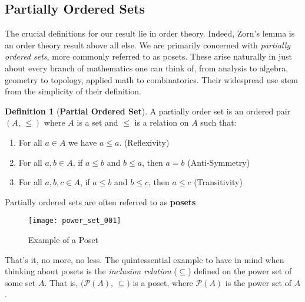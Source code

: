 \documentclass{article}
\theoremstyle{definition}
\newtheorem{definition}{Definition}[section]
\begin{document}
        \subsection{Partially Ordered Sets}
            The crucial definitions for our result lie in order theory. Indeed,
            Zorn's lemma is an order theory result above all else. We are
            primarily concerned with \textit{partially ordered sets}, more
            commonly referred to as posets. These arise naturally in just
            about every branch of mathematics one can think of, from analysis
            to algebra, geometry to topology, applied math to combinatorics.
            Their widespread use stem from the simplicity of their definition.
            \begin{definition}[\textbf{Partial Ordered Set}]
                A partially order set is an ordered pair $(A,\,\leq)$ where $A$
                is a set and $\leq$ is a relation on $A$ such that:
                \begin{enumerate}
                    \item
                        For all $a\in{A}$ we have $a\leq{a}$.
                        \hfill
                        (Reflexivity)
                    \item
                        For all $a,b\in{A}$, if $a\leq{b}$ and $b\leq{a}$,
                        then $a=b$
                        \hfill
                        (Anti-Symmetry)
                    \item
                        For all $a,b,c\in{A}$, if $a\leq{b}$ and
                        $b\leq{c}$, then $a\leq{c}$
                        \hfill
                        (Transitivity)
                \end{enumerate}
                Partially ordered sets are often referred to as
                \textbf{posets}
            \end{definition}
            \begin{figure}
                \centering
                \texttt{[image: power\_set\_001]}
                \caption{Example of a Poset}
                \label{fig:power_set}
            \end{figure}
            That's it, no more, no less. The quintessential example to have
            in mind when thinking about posets is the
            \textit{inclusion relation} ($\subseteq$) defined on the power set
            of some set $A$. That is, $\big(\mathcal{P}(A),\,\subseteq\big)$
            is a poset, where $\mathcal{P}(A)$ is the power set of $A$.
\end{document}
